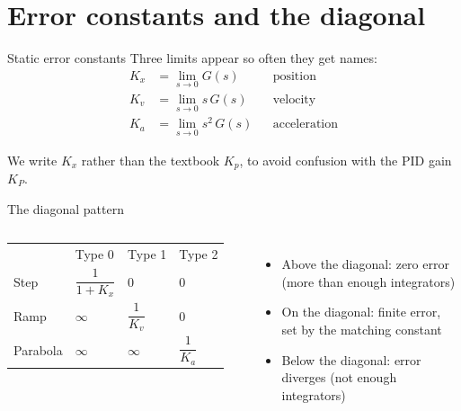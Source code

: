 \documentclass[aspectratio=169,12pt]{beamer}
\begin{document}
\section{Error constants and the diagonal}

\begin{frame}{Static error constants}
  Three limits appear so often they get names:
  \begin{align*}
    K_x &= \lim_{s\to 0} G(s)      && \text{position} \\[2pt]
    K_v &= \lim_{s\to 0} s\,G(s)   && \text{velocity} \\[2pt]
    K_a &= \lim_{s\to 0} s^2\,G(s) && \text{acceleration}
  \end{align*}

  \bigskip
  \small We write $K_x$ rather than the textbook $K_p$, to avoid confusion with the PID gain $K_P$.
\end{frame}

\begin{frame}{The diagonal pattern}
  \begin{columns}[c]
    \centering
    \renewcommand{\arraystretch}{2.0}
    \setlength{\tabcolsep}{4pt}
    \begin{tabular}{l>{\centering\arraybackslash}p{1.5cm}>{\centering\arraybackslash}p{1.5cm}>{\centering\arraybackslash}p{1.5cm}}
               & Type 0 & Type 1 & Type 2 \\
      Step     & \cellcolor{finite}$\dfrac{1}{1+K_x}$ & \cellcolor{zero}$0$ & \cellcolor{zero}$0$ \\
      Ramp     & \cellcolor{diverge}$\infty$ & \cellcolor{finite}$\dfrac{1}{K_v}$ & \cellcolor{zero}$0$ \\
      Parabola & \cellcolor{diverge}$\infty$ & \cellcolor{diverge}$\infty$ & \cellcolor{finite}$\dfrac{1}{K_a}$ \\
    \end{tabular}

    \small
    \begin{itemize}
      \item[\textcolor{zero!60!black}{$\blacksquare$}] Above the diagonal: zero error (more than enough integrators)
      \item[\textcolor{finite!60!black}{$\blacksquare$}] On the diagonal: finite error, set by the matching constant
      \item[\textcolor{diverge!60!black}{$\blacksquare$}] Below the diagonal: error diverges (not enough integrators)
    \end{itemize}
  \end{columns}
\end{frame}
\end{document}
